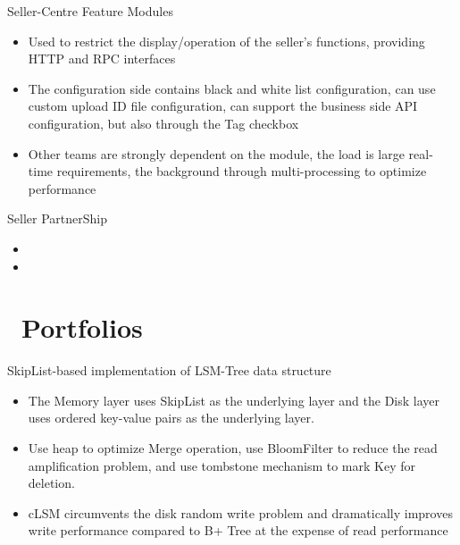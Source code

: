 \documentclass{resume}
\newcommand{\en}[1]{#1}
\newcommand{\zh}[1]{}
\begin{document}
\en{Seller-Centre Feature Modules}
\zh{Seller-Centre Feature 模块}
\begin{itemize}
      \item \en{Used to restrict the display/operation of the seller's functions, providing HTTP and RPC interfaces}
            \zh{用于限制卖家的功能显示/操作,对外提供 HTTP 以及 RPC 查询接口}
      \item \en{The configuration side contains black and white list configuration, can use custom upload ID file configuration, can support the business side API configuration, but also through the Tag checkbox}
            \zh{配置端包含黑白名单配置,支持上传/勾选 Tag/API 等多种方式配置,有回滚/user 端通知/Tag 标记等 Feature}
      \item \en{Other teams are strongly dependent on the module, the load is large real-time requirements, the background through multi-processing to optimize performance}
            \zh{其它团队强依赖模块,负载大实时性要求强,后台通过多协程处理优化性能}
\end{itemize}

\en{Seller PartnerShip}
\zh{Seller PartnerShip}
\begin{itemize}
      \item \en{}
            \zh{项目 owner,独立完成后端设计与开发,项目需对接多个团队}
      \item \en{}
            \zh{使用 gin 开发,包含充值/兑换/券码/订单/用户/定时任务/邮件通知等模块}
\end{itemize}

\section{\faGithubAlt\ \en{Portfolios}\zh{个人项目}}
\en{SkipList-based implementation of LSM-Tree data structure}
\zh{基于 SkipList 的 LSM-Tree 数据结构实现}
\begin{itemize}[parsep=0.5ex]
      \item \en{The Memory layer uses SkipList as the underlying layer and the Disk layer uses ordered key-value pairs as the underlying layer.}
            \zh{Memory 层采用 SkipList 作为底层,Disk 层使用有序键值对作为底层}
      \item \en{Use heap to optimize Merge operation, use BloomFilter to reduce the read amplification problem, and use tombstone mechanism to mark Key for deletion.}
            \zh{利用堆优化 Merge 操作,利用 BloomFilter 降低读放大问题,删除采用墓碑机制标记 Key}
      \item \en{cLSM circumvents the disk random write problem and dramatically improves write performance compared to B+ Tree at the expense of read performance}
            \zh{cLSM 规避磁盘随机写入问题,相比 B+ Tree 牺牲读性能,大幅提高写性能}
\end{itemize}
\end{document}
